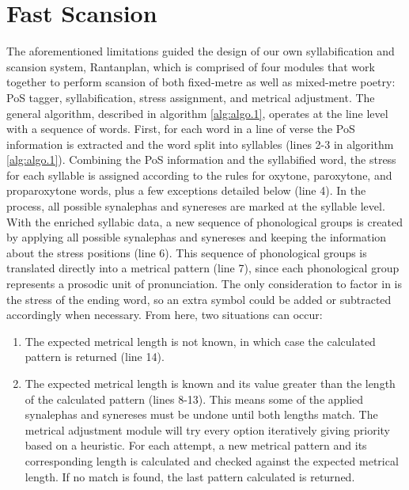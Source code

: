 \documentclass[a4paper,11pt,twocolumn,twoside]{article}
\begin{document}
\section{Fast Scansion}
The aforementioned limitations guided the design of our own syllabification and scansion system, Rantanplan, which is comprised of four modules that work together to perform scansion of both fixed-metre as well as mixed-metre poetry: PoS tagger, syllabification, stress assignment, and metrical adjustment. The general algorithm, described in algorithm \ref{alg:algo.1}, operates at the line level with a sequence of words. First, for each word in a line of verse the PoS information is extracted and the word split into syllables (lines 2-3 in algorithm \ref{alg:algo.1}). Combining the PoS information and the syllabified word, the stress for each syllable is assigned according to the rules for oxytone, paroxytone, and proparoxytone words, plus a few exceptions detailed below (line 4). In the process, all possible synalephas and synereses are marked at the syllable level. With the enriched syllabic data, a new sequence of phonological groups is created by applying all possible synalephas and synereses and keeping the information about the stress positions (line 6). This sequence of phonological groups is translated directly into a metrical pattern (line 7), since each phonological group represents a prosodic unit of pronunciation. The only consideration to factor in is the stress of the ending word, so an extra symbol could be added or subtracted accordingly when necessary. From here, two situations can occur:
\begin{enumerate}
\item The expected metrical length is not known, in which case the calculated pattern is returned (line 14).
\item The expected metrical length is known and its value greater than the length of the calculated pattern (lines 8-13). This means some of the applied synalephas and synereses must be undone until both lengths match. The metrical adjustment module will try every option iteratively giving priority based on a heuristic. For each attempt, a new metrical pattern and its corresponding length is calculated and checked against the expected metrical length. If no match is found, the last pattern calculated is returned.
\end{enumerate}
\end{document}
